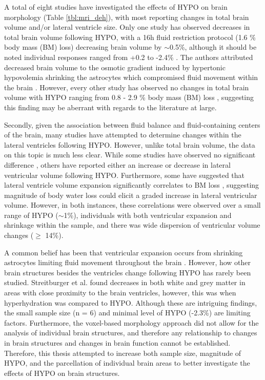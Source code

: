 A total of eight studies have investigated the effects of HYPO on brain morphology (Table \ref{tbl:mri_deh}), with most reporting changes in total brain volume and/or lateral ventricle size. Only one study has observed decreases in total brain volume following HYPO, with a 16h fluid restriction protocol (1.6 \% body mass (BM) loss) decreasing brain volume by ${\sim}$0.5\%, although it should be noted individual responses ranged from +0.2 to -2.4\% \cite{duning_dehydration_2005}. The authors attributed decreased brain volume to the osmotic gradient induced by hypertonic hypovolemia shrinking the astrocytes which compromised fluid movement within the brain \cite{duning_dehydration_2005}. However, every other study has observed no changes in total brain volume with HYPO ranging from 0.8 - 2.9 \% body mass (BM) loss \cite{watson_effect_2010,kempton_effects_2009,kempton_dehydration_2011,meyers_does_2016}, suggesting this finding may be aberrant with regards to the literature at large.

Secondly, given the association between fluid balance and fluid-containing centers of the brain, many studies have attempted to determine changes within the lateral ventricles following HYPO. However, unlike total brain volume, the data on this topic is much less clear. While some studies have observed no significant difference \cite{meyers_does_2016, dickson_effects_2005, streitburger_investigating_2012,meyers_does_2016,dickson_effects_2005}, others have reported either an increase \cite{kempton_dehydration_2011,kempton_effects_2009} or decrease \cite{watson_effect_2010} in lateral ventricular volume following HYPO. Furthermore, some have suggested that lateral ventricle volume expansion significantly correlates to BM loss \cite{kempton_dehydration_2011, dickson_effects_2005}, suggesting magnitude of body water loss could elicit a graded increase in lateral ventricular volume. However, in both instances, these correlations were observed over a small range of HYPO (${\sim}$1\%), individuals with both ventricular expansion and shrinkage within the sample, and there was wide dispersion of ventricular volume changes (${\ge}$ 14\%). 

A common belief has been that ventricular expansion occurs from shrinking astrocytes limiting fluid movement throughout the brain \cite{kempton_dehydration_2011}. However, how other brain structures besides the ventricles change following HYPO has rarely been studied. Streitburger et al. \cite{streitburger_investigating_2012} found decreases in both white and grey matter in areas with close proximity to the brain ventricles, however, this was when hyperhydration was compared to HYPO. Although these are intriguing findings, the small sample size (n = 6) and minimal level of HYPO (-2.3\%) are limiting factors. Furthermore, the voxel-based morphology approach did not allow for the analysis of individual brain structures, and therefore any relationship to changes in brain structures and changes in brain function cannot be established. Therefore, this thesis attempted to increase both sample size, magnitude of HYPO, and the parcellation of individual brain areas to better investigate the effects of HYPO on brain structures. 

